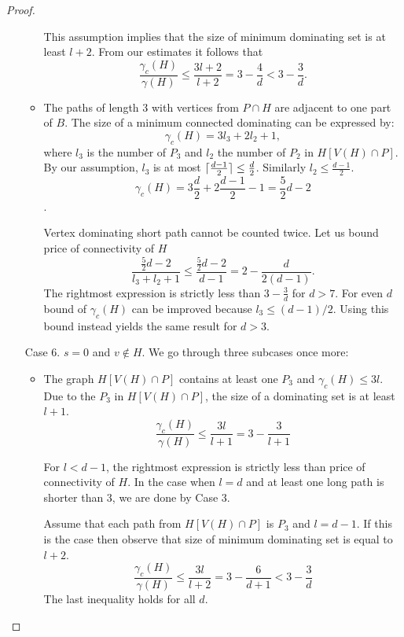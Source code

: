 \begin{proof}
\begin{enumerate}
\begin{itemize}
			This assumption implies that the size of minimum dominating set is at least \(l + 2\).
			From our estimates it follows that
			\[{\frac{\gamma_c(H)}{\gamma(H)}} \leq {\frac{3l + 2}{l + 2}} = {3 - \frac{4}{d}} < {3 - \frac{3}{d}}.\]

			
			\item The paths of length 3 with vertices from \(P \cap H\) are adjacent to one part of \(B\).
			The size of a minimum connected dominating can be expressed by:
				\[\gamma_c(H) = {3l_3 + 2l_2 + 1},\]
				where \(l_3\) is the number of \(P_3\) and \(l_2\) the number of \(P_2\) in \(H[V(H) \cap P]\).
			By our assumption, \(l_3\) is at most \(\lceil\frac{d - 1}{2}\rceil \leq {\frac{d}{2}}\).
			Similarly \(l_2 \leq \frac{d-1}{2}\).
				\[\gamma_c(H) = {3\frac{d}{2} + 2\frac{d-1}{2} - 1} = {\frac{5}{2}d - 2}\].
			
			Vertex dominating short path cannot be counted twice. %
			Let us bound price of connectivity of \(H\)
				\[\frac{\frac{5}{2}d - 2}{l_3 + l_2 + 1} \leq {\frac{\frac {5}{2}d - 2}{d-1}} = 2 - \frac{d}{2(d-1)}.\]
			The rightmost expression is strictly less than \(3-\frac{3}{d}\) for \(d > 7\).
			For even \(d\) bound of \(\gamma_c(H)\) can be improved because \(l_3 \leq (d-1)/2\). %
			Using this bound instead yields the same result for \(d > 3\).
			\end{itemize}
	\end{enumerate}

        \goodbreak
	\begin{enumerate}
	\item [Case 6.]\(s = 0\) and \(v \not\in H\). We go through three subcases once more:
		\begin{itemize}
			\item The graph \(H[V(H) \cap P]\) contains at least one \(P_3\) and \(\gamma_c(H) \leq 3l\).
				Due to the \(P_3\) in \(H[V(H) \cap P]\), the size of a dominating set is at least \(l + 1\).
			\[\frac{\gamma_c(H)}{\gamma(H)} \leq {\frac{3l}{l + 1}} = 3 - \frac{3}{l + 1}\]
		
			For \(l < d - 1\), the rightmost expression is strictly less than price of connectivity  of \(H\).
			In the case when \(l = d\) and at least one long path is shorter than 3, we are done
			by Case 3.

			Assume that each path from \(H[V(H) \cap P]\) is \(P_3\) and \(l = d-1\).
			If this is the case then observe that size of minimum dominating set is equal to \(l + 2\).
				\[\frac{\gamma_c(H)}{\gamma(H)} \leq {\frac{3l}{l + 2}} = 3 - \frac{6}{d + 1} < 3-\frac{3}{d}\]
			The last inequality holds for all \(d\).	


\end{itemize}
\end{enumerate}
\end{proof}
